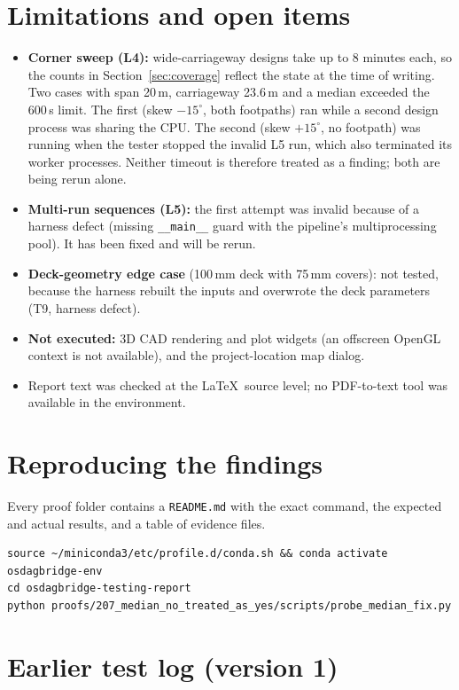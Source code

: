 \documentclass[11pt,a4paper]{article}
\begin{document}
\section{Limitations and open items}\label{sec:limits}
\begin{itemize}[nosep]
  \item \textbf{Corner sweep (L4):} wide-carriageway designs take up to 8 minutes each, so the counts in Section~\ref{sec:coverage} reflect the state at the time of writing. Two cases with span 20\,m, carriageway 23.6\,m and a median exceeded the 600\,s limit. The first (skew $-15^\circ$, both footpaths) ran while a second design process was sharing the CPU. The second (skew $+15^\circ$, no footpath) was running when the tester stopped the invalid L5 run, which also terminated its worker processes. Neither timeout is therefore treated as a finding; both are being rerun alone.
  \item \textbf{Multi-run sequences (L5):} the first attempt was invalid because of a harness defect (missing \texttt{\_\_main\_\_} guard with the pipeline's multiprocessing pool). It has been fixed and will be rerun.
  \item \textbf{Deck-geometry edge case} (100\,mm deck with 75\,mm covers): not tested, because the harness rebuilt the inputs and overwrote the deck parameters (T9, harness defect).
  \item \textbf{Not executed:} 3D CAD rendering and plot widgets (an offscreen OpenGL context is not available), and the project-location map dialog.
  \item Report text was checked at the \LaTeX\ source level; no PDF-to-text tool was available in the environment.
\end{itemize}

\appendix
\section{Reproducing the findings}
Every proof folder contains a \texttt{README.md} with the exact command, the expected and actual results, and a table of evidence files.
\begin{verbatim}
source ~/miniconda3/etc/profile.d/conda.sh && conda activate osdagbridge-env
cd osdagbridge-testing-report
python proofs/207_median_no_treated_as_yes/scripts/probe_median_fix.py
\end{verbatim}

\section{Earlier test log (version 1)}

\end{document}

